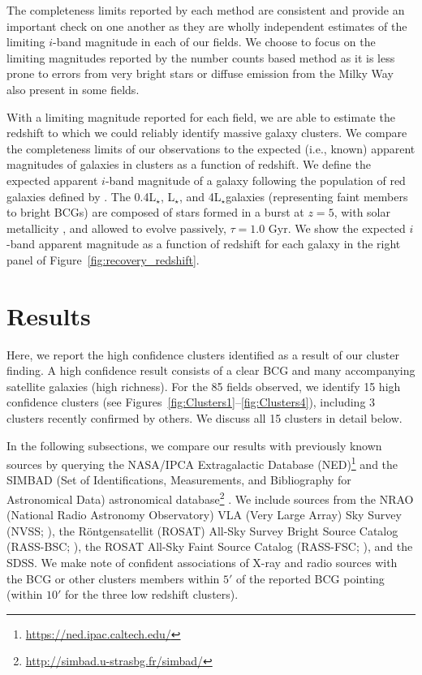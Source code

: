 \documentclass[apj, revtex4-1]{emulateapj}
\newcommand{\sdssi}{\hbox{$i$}}
\newcommand{\lstar}{\hbox{L$_{\star}$}}
\newcommand{\ie}{i.e.}
\begin{document}
The completeness limits reported by each method are consistent and provide an important check on one another as they are wholly independent estimates of the limiting \sdssi-band magnitude in each of our fields. We choose to focus on the limiting magnitudes reported by the number counts based method as it is less prone to errors from very bright stars or diffuse emission from the Milky Way also present in some fields.

With a limiting magnitude reported for each field, we are able to estimate the redshift to which we could reliably identify massive galaxy clusters. We compare the completeness limits of our observations to the expected (\ie, known) apparent magnitudes of galaxies in clusters as a function of redshift. We define the expected apparent \sdssi-band magnitude of a galaxy following the population of red galaxies defined by \cite{Blanton2003}. The 0.4\lstar, \lstar, and 4\lstar galaxies (representing faint members to bright BCGs) are composed of stars formed in a burst at $z = 5$, with solar metallicity \citep{Bruzual2003}, and allowed to evolve passively, $\tau = 1.0$ Gyr. We show the expected \sdssi-band apparent magnitude as a function of redshift for each galaxy in the right panel of Figure~\ref{fig:recovery_redshift}.

\section{Results}\label{sec:results}
Here, we report the high confidence clusters identified as a result of our cluster finding. A high confidence result consists of a clear BCG and many accompanying satellite galaxies (high richness). For the 85 fields observed, we identify 15 high confidence clusters (see Figures~\ref{fig:Clusters1}--\ref{fig:Clusters4}), including 3 clusters recently confirmed by others. We discuss all 15 clusters in detail below.

In the following subsections, we compare our results with previously known sources by querying the NASA/IPCA Extragalactic Database (NED)\footnote{\url{https://ned.ipac.caltech.edu/}} and the SIMBAD (Set of Identifications, Measurements, and Bibliography for Astronomical Data) astronomical database\footnote{\url{http://simbad.u-strasbg.fr/simbad/}} \citep{Wenger2000}. We include sources from the NRAO (National Radio Astronomy Observatory) VLA (Very Large Array) Sky Survey (NVSS; \citealt{Condon1998}), the R\"{o}ntgensatellit (ROSAT) All-Sky Survey Bright Source Catalog (RASS-BSC; \citealt{Voges1999a}), the ROSAT All-Sky Faint Source Catalog (RASS-FSC; \citealt{Voges2000}), and the SDSS. We make note of confident associations of X-ray and radio sources with the BCG or other clusters members within $5'$ of the reported BCG pointing (within $10'$ for the three low redshift clusters).
\end{document}
